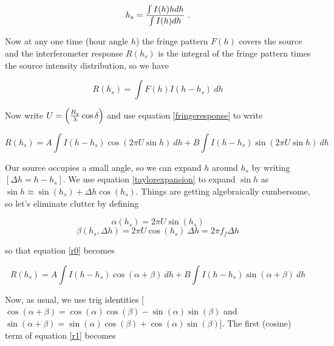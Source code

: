 \documentclass[11pt,preprint]{aastex}
\begin{document}
\begin{equation}
h_s = { \int I(h)h dh \over \int I(h) dh} \ .
\end{equation}

	Now at any one time (hour angle $h$) the fringe pattern $F(h)$
covers the source and the interferometer response $R(h_s)$ is the integral
of the fringe pattern times the source intensity distribution, so we
have

\begin{equation}
R(h_s) = \int F(h) I(h-h_s) \ d h
\end{equation}

\noindent Now write $U = \left( {B_y \over \lambda} \cos\delta \right)$
and use equation \ref {fringeresponse} to write

\begin{equation} \label{r0}
R(h_s) = A \int I(h-h_s) \cos( 2\pi U \sin h) \ dh +  
	B \int I(h-h_s) \sin( 2\pi U \sin h) \ dh
\end{equation} 

	Our source occupies a small angle, so we can expand $h$ around $h_s$
by writing $[\Delta h = h-h_s]$. We use equation \ref{taylorexpansion} to
expand $\sin h$ as $\sin h \approx \sin( h_s) + \Delta h \cos( h_s)$.
Things are getting algebraically cumbersome, so let's eliminate
clutter by defining 

\begin{mathletters}
\begin{equation}
\alpha(h_s) = 2 \pi U \sin(h_s) 
\end{equation}
\begin{equation}
\beta(h_s, \Delta h) = 2 \pi U \cos(h_s) \  \Delta h = 2 \pi f_f \Delta h
\end{equation}
\end{mathletters}

\noindent [where $U = \left( {B \over \lambda} \cos\delta \right)$] so that equation \ref{r0} becomes

\begin{equation} \label{r1}
R(h_s) = A \int I(h-h_s) \cos( \alpha + \beta) \ dh +  
	B \int I(h-h_s) \sin( \alpha + \beta) \ dh
\end{equation} 

\noindent Now, as usual, we use trig identities [$\cos(\alpha + \beta) =
  \cos(\alpha) \cos(\beta) - \sin(\alpha) \sin(\beta)$ and $\sin(\alpha
  + \beta) = \sin(\alpha) \cos(\beta) + \cos(\alpha) \sin(\beta)$]. The
  first (cosine) term of equation \ref{r1} becomes
\end{document}
